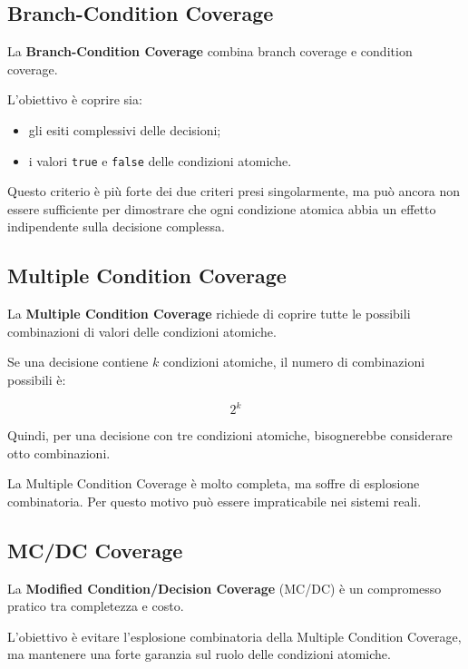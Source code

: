 \subsection{Branch-Condition Coverage}

La \textbf{Branch-Condition Coverage} combina branch coverage e condition coverage.

L'obiettivo è coprire sia:

\begin{itemize}
    \item gli esiti complessivi delle decisioni;
    \item i valori \texttt{true} e \texttt{false} delle condizioni atomiche.
\end{itemize}

Questo criterio è più forte dei due criteri presi singolarmente, ma può ancora non essere sufficiente per dimostrare che ogni condizione atomica abbia un effetto indipendente sulla decisione complessa.

\subsection{Multiple Condition Coverage}

La \textbf{Multiple Condition Coverage} richiede di coprire tutte le possibili combinazioni di valori delle condizioni atomiche.

Se una decisione contiene \(k\) condizioni atomiche, il numero di combinazioni possibili è:

\[
2^k
\]

Quindi, per una decisione con tre condizioni atomiche, bisognerebbe considerare otto combinazioni.

\begin{notaesame}
La Multiple Condition Coverage è molto completa, ma soffre di esplosione combinatoria. Per questo motivo può essere impraticabile nei sistemi reali.
\end{notaesame}

\subsection{MC/DC Coverage}

La \textbf{Modified Condition/Decision Coverage} (MC/DC) è un compromesso pratico tra completezza e costo.

L'obiettivo è evitare l'esplosione combinatoria della Multiple Condition Coverage, ma mantenere una forte garanzia sul ruolo delle condizioni atomiche.

